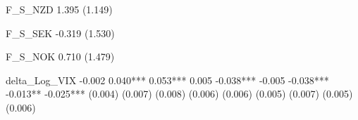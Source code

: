 F_S_NZD                                                                                                                                                                        1.395                                                         
                                                                                                                                                                              (1.149)                                                        
                                                                                                                                                                                                                                             
F_S_SEK                                                                                                                                                                                               -0.319                                 
                                                                                                                                                                                                      (1.530)                                
                                                                                                                                                                                                                                             
F_S_NOK                                                                                                                                                                                                                        0.710         
                                                                                                                                                                                                                              (1.479)        
                                                                                                                                                                                                                                             
delta_Log_VIX               -0.002                 0.040***                0.053***                  0.005                 -0.038***                  -0.005                 -0.038***               -0.013**                -0.025***       
                            (0.004)                 (0.007)                 (0.008)                 (0.006)                 (0.006)                  (0.005)                  (0.007)                 (0.005)                 (0.006)        
                                                                                                                                                                                                                                             
